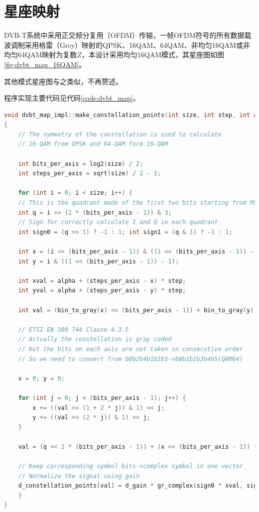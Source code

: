 	\section{星座映射}
		\par DVB-T系统中采用正交频分复用（OFDM）传输，一帧OFDM符号的所有数据载波调制采用格雷（Grey）映射的QPSK、16QAM、64QAM、非均匀16QAM或非均匀64QAM映射为复数$Z$，本设计采用均匀16QAM模式，其星座图如图\ref{fig:dvbt_map_16QAM}。
		
		\par 其他模式星座图与之类似，不再赘述。
		\par 程序实现主要代码见代码\ref{code:dvbt_map}。
		\begin{lstlisting}[caption = {星座映射},label = {code:dvbt_map}, language = C++ ]
void dvbt_map_impl::make_constellation_points(int size, int step, int alpha)
{
	// The symmetry of the constellation is used to calculate
	// 16-QAM from QPSK and 64-QAM form 16-QAM

	int bits_per_axis = log2(size) / 2;
	int steps_per_axis = sqrt(size) / 2 - 1;

	for (int i = 0; i < size; i++) {
	// This is the quadrant made of the first two bits starting from MSB
	int q = i >> (2 * (bits_per_axis - 1)) & 3;
	// Sign for correctly calculate I and Q in each quadrant
	int sign0 = (q >> 1) ? -1 : 1; int sign1 = (q & 1) ? -1 : 1;

	int x = (i >> (bits_per_axis - 1)) & ((1 << (bits_per_axis - 1)) - 1);
	int y = i & ((1 << (bits_per_axis - 1)) - 1);

	int xval = alpha + (steps_per_axis - x) * step;
	int yval = alpha + (steps_per_axis - y) * step;

	int val = (bin_to_gray(x) << (bits_per_axis - 1)) + bin_to_gray(y);

	// ETSI EN 300 744 Clause 4.3.5
	// Actually the constellation is gray coded
	// but the bits on each axis are not taken in consecutive order
	// So we need to convert from b0b2b4b1b3b5->b0b1b2b3b4b5(QAM64)

	x = 0; y = 0;

	for (int j = 0; j < (bits_per_axis - 1); j++) {
		x += ((val >> (1 + 2 * j)) & 1) << j;
		y += ((val >> (2 * j)) & 1) << j;
	}

	val = (q << 2 * (bits_per_axis - 1)) + (x << (bits_per_axis - 1)) + y;

	// Keep corresponding symbol bits->complex symbol in one vector
	// Normalize the signal using gain
	d_constellation_points[val] = d_gain * gr_complex(sign0 * xval, sign1 * yval);
	}
}
		\end{lstlisting}
